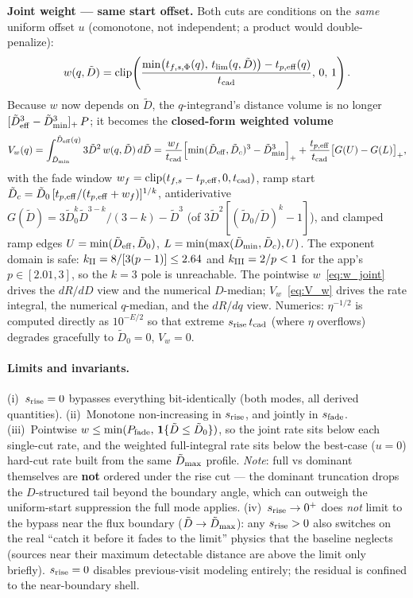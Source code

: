 \documentclass[11pt,a4paper]{article}
\begin{document}
\textbf{Joint weight --- same start offset.} Both cuts are conditions on the \emph{same} uniform offset $u$ (comonotone, not independent; a product would double-penalize):
\begin{equation}
\label{eq:w_joint}
w(q,\tilde D)=\operatorname{clip}\!\left(\frac{\min\bigl(t_{f,s,\Phi}(q),\,t_{\rm lim}(q,\tilde D)\bigr)-t_{p,\rm eff}(q)}{t_{\rm cad}},\,0,\,1\right).
\end{equation}
Because $w$ now depends on $\tilde D$, the $q$-integrand's distance volume is no longer $[\tilde D_{\rm eff}^3-\tilde D_{\rm min}^3]_+\,P$; it becomes the \textbf{closed-form weighted volume}
\begin{equation}
\label{eq:V_w}
V_w(q)=\int_{\tilde D_{\rm min}}^{\tilde D_{\rm eff}(q)}3\tilde D^2\,w(q,\tilde D)\,d\tilde D
=\frac{w_f}{t_{\rm cad}}\Bigl[\min(\tilde D_{\rm eff},\tilde D_c)^3-\tilde D_{\rm min}^3\Bigr]_+
+\frac{t_{p,\rm eff}}{t_{\rm cad}}\bigl[G(U)-G(L)\bigr]_+,
\end{equation}
with the fade window $w_f=\operatorname{clip}(t_{f,s}-t_{p,\rm eff},0,t_{\rm cad})$, ramp start $\tilde D_c=\tilde D_0\,[t_{p,\rm eff}/(t_{p,\rm eff}+w_f)]^{1/k}$, antiderivative $G(\tilde D)=3\tilde D_0^{k}\tilde D^{3-k}/(3-k)-\tilde D^3$ (of $3\tilde D^2[(\tilde D_0/\tilde D)^k-1]$), and clamped ramp edges $U=\min(\tilde D_{\rm eff},\tilde D_0)$, $L=\min(\max(\tilde D_{\rm min},\tilde D_c),U)$. The exponent domain is safe: $k_{\rm II}=8/[3(p-1)]\le 2.64$ and $k_{\rm III}=2/p<1$ for the app's $p\in[2.01,3]$, so the $k=3$ pole is unreachable. The pointwise $w$~\eqref{eq:w_joint} drives the $dR/dD$ view and the numerical $D$-median; $V_w$~\eqref{eq:V_w} drives the rate integral, the numerical $q$-median, and the $dR/dq$ view. Numerics: $\eta^{-1/2}$ is computed directly as $10^{-E/2}$ so that extreme $s_{\rm rise}\,t_{\rm cad}$ (where $\eta$ overflows) degrades gracefully to $\tilde D_0=0$, $V_w=0$.

\paragraph{Limits and invariants.}
(i)~$s_{\rm rise}=0$ bypasses everything bit-identically (both modes, all derived quantities).
(ii)~Monotone non-increasing in $s_{\rm rise}$, and jointly in $s_{\rm fade}$.
(iii)~Pointwise $w\le\min(P_{\rm fade},\,\mathbf 1\{\tilde D\le\tilde D_0\})$, so the joint rate sits below each single-cut rate, and the weighted full-integral rate sits below the best-case ($u=0$) hard-cut rate built from the same $\tilde D_{\rm max}$ profile. \emph{Note}: full vs dominant themselves are \textbf{not} ordered under the rise cut --- the dominant truncation drops the $D$-structured tail beyond the boundary angle, which can outweigh the uniform-start suppression the full mode applies.
(iv)~$s_{\rm rise}\to 0^{+}$ does \emph{not} limit to the bypass near the flux boundary ($\tilde D\to\tilde D_{\rm max}$): any $s_{\rm rise}>0$ also switches on the real ``catch it before it fades to the limit'' physics that the baseline neglects (sources near their maximum detectable distance are above the limit only briefly). $s_{\rm rise}=0$ disables previous-visit modeling entirely; the residual is confined to the near-boundary shell.
\end{document}
